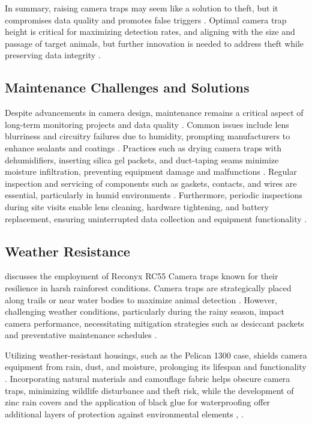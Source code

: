 \documentclass[class=report,11pt,crop=false]{standalone}
\begin{document}
In summary, raising camera traps may seem like a solution to theft, but it compromises data quality and promotes false triggers \cite{meek2016higher}. Optimal camera trap height is critical for maximizing detection rates, and aligning with the size and passage of target animals, but further innovation is needed to address theft while preserving data integrity \cite{meek2016higher}. 

\subsection{Maintenance Challenges and Solutions}

Despite advancements in camera design, maintenance remains a critical aspect of long-term monitoring projects and data quality \cite{kays2009camera}. Common issues include lens blurriness and circuitry failures due to humidity, prompting manufacturers to enhance sealants and coatings \cite{kays2009camera}. Practices such as drying camera traps with dehumidifiers, inserting silica gel packets, and duct-taping seams minimize moisture infiltration, preventing equipment damage and malfunctions \cite{glover2019camera}.  Regular inspection and servicing of components such as gaskets, contacts, and wires are essential, particularly in humid environments \cite{glover2019camera}. Furthermore, periodic inspections during site visits enable lens cleaning, hardware tightening, and battery replacement, ensuring uninterrupted data collection and equipment functionality \cite{glover2019camera}. 

 
\subsection{Weather Resistance}

\cite{kays2009camera} discusses the employment of Reconyx RC55 Camera traps known for their resilience in harsh rainforest conditions. Camera traps are strategically placed along trails or near water bodies to maximize animal detection \cite{kays2009camera}. However, challenging weather conditions, particularly during the rainy season, impact camera performance, necessitating mitigation strategies such as desiccant packets and preventative maintenance schedules \cite{kays2009camera}.

Utilizing weather-resistant housings, such as the Pelican 1300 case, shields camera equipment from rain, dust, and moisture, prolonging its lifespan and functionality \cite{kays2009camera}. Incorporating natural materials and camouflage fabric helps obscure camera traps, minimizing wildlife disturbance and theft risk, while the development of zinc rain covers and the application of black glue for waterproofing offer additional layers of protection against environmental elements \cite{kays2009camera}, \cite{glover2019camera}. 
\end{document}
